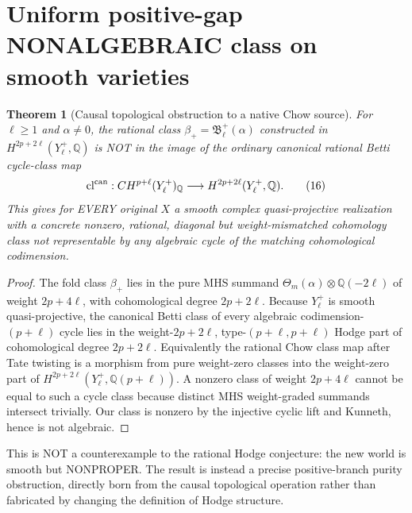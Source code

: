 \documentclass[11pt]{article}
\newtheorem{theorem}{Theorem}
\begin{document}
\section{Uniform positive-gap NONALGEBRAIC class on smooth varieties}
\begin{theorem}[Causal topological obstruction to a native Chow source]
For $\ell\ge1$ and $\alpha\ne0$, the rational class
$\beta_+=\mathfrak B^+_{\ell}(\alpha)$ constructed in
$H^{2p+2\ell}(Y^+_\ell,\mathbb Q)$ is NOT in the image
of the ordinary canonical rational Betti cycle-class map
\[
 \mathrm{cl}^{\rm can}:
 CH^{p+\ell}(Y^+_\ell)_{\mathbb Q}
       \longrightarrow H^{2p+2\ell}(Y^+_\ell,\mathbb Q).
 \tag{16}
\]
This gives for EVERY original $X$ a smooth complex
quasi-projective realization with a concrete nonzero,
rational, diagonal but weight-mismatched cohomology class
not representable by any algebraic cycle of the matching
cohomological codimension.
\end{theorem}
\begin{proof}
The fold class $\beta_+$ lies in the pure MHS summand
$\Theta_m(\alpha)\otimes\mathbb Q(-2\ell)$ of weight
$2p+4\ell$, with cohomological degree $2p+2\ell$.
Because $Y^+_\ell$ is smooth quasi-projective,
the canonical Betti class of every algebraic
codimension-$(p+\ell)$ cycle lies in the
weight-$2p+2\ell$, type-$(p+\ell,p+\ell)$
Hodge part of cohomological degree $2p+2\ell$.
Equivalently the rational Chow class map after
Tate twisting is a morphism from pure weight-zero
classes into the weight-zero part of
$H^{2p+2\ell}(Y^+_\ell,\mathbb Q(p+\ell))$.
A nonzero class of weight $2p+4\ell$ cannot
be equal to such a cycle class because distinct
MHS weight-graded summands intersect trivially.
Our class is nonzero by the injective cyclic
lift and Kunneth, hence is not algebraic.
\end{proof}
This is NOT a counterexample to the rational Hodge
conjecture: the new world is smooth but NONPROPER.
The result is instead a precise positive-branch
purity obstruction, directly born from the causal
topological operation rather than fabricated by
changing the definition of Hodge structure.
\end{document}
